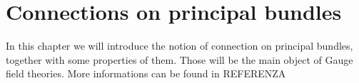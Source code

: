 \documentclass[12pt,a4paper]{report}
\theoremstyle{definition}
\theoremstyle{Theorem}
\newtheorem{Prop}[Def]{Proposition}
\theoremstyle{definition}
\newtheorem{Ex}[Def]{Example}
\theoremstyle{definition}
\begin{document}
	\chapter{Connections on principal bundles}
	In this chapter we will introduce the notion of connection on principal bundles, together with some properties of them. Those will be the main object of Gauge field theories. More informations can be found in REFERENZA
	\begin{comment}
		\chapter{Connections on Principal bundles}
		\section{Fundamental vector fields}
		Suppose to have a Lie group $G$ that right-acts smoothly on a manifold $M$. Then, consider any element $A\in\mathfrak{g}$ inside the Lie Algebra of $G$. Define:
		$$\bar{A}={d\over dt}\bigg|_{t=0}p\cdot e^{tA}\in T_pM$$
		This, at any point is called \textbf{fundamental vector field associated to $A$}.\\
		\begin{center}
			\texttt{[image: fundamental\_vector.pdf]}
		\end{center}
		The idea is to take a point $p\in M$ and a curve passing through it like $c_p(t)=p\cdot e^{tA}$. This is a smooth curve and so it can be derived. The fundamental vector field in $p$ is the initial tangent vector of this curve (initial in the sense that for $t=0$ the curve goes through $p$).
		\begin{Prop}
			The fundamentale vector field associated to $A$ is always smooth.
		\end{Prop}
		\begin{proof}
			Non ne ho voglia ma è una cazzata di conti.
		\end{proof}
		There is an alternative mathematical construction for the same concept: define the map $j_p:G\rightarrow M$ like follows:
		$$j_p(g)=p\cdot g$$
		Its differential is defined as:
		$$dj_p(A\in\mathfrak{g})={d\over dt}\bigg|_{t=0}j_p(e^{tA})={d\over dt}\bigg|_{t=0}p\cdot e^{tA}$$
		\begin{Ex}
			Consider the flat Euclidean manifold $\mathbb{R}^2$ and the Lie group $U(1)$ of complex modulo 1 numbers. The Lie algebra of the group is $\mathfrak{u}(1)={i\theta;\theta\in\mathbb{R}}$ made up of all multiples of $i$. We set the following action of $U(1)$ on $\mathbb{R}^2$ given by: $e^{i\theta}(x,y)=(xcos(\theta)-ysin\theta,ycos(\theta)+xsin(\theta))$.

\end{comment}
\end{document}
